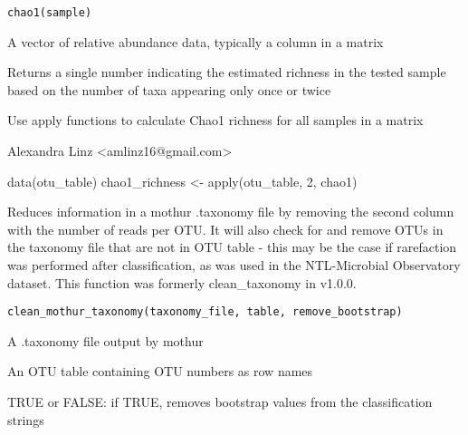 \documentclass[a4paper]{book}
\begin{document}
%
\begin{Usage}
\begin{verbatim}
chao1(sample)
\end{verbatim}
\end{Usage}
%
\begin{Arguments}
\begin{ldescription}
\item[\code{sample}] 
A vector of relative abundance data, typically a column in a matrix

\end{ldescription}
\end{Arguments}
%
\begin{Value}
Returns a single number indicating the estimated richness in the tested sample based on the number of taxa appearing only once or twice
\end{Value}
%
\begin{Note}\relax
Use apply functions to calculate Chao1 richness for all samples in a matrix

\end{Note}
%
\begin{Author}\relax
Alexandra Linz <amlinz16@gmail.com>
\end{Author}
%
\begin{Examples}
\begin{ExampleCode}
data(otu_table)
chao1_richness <- apply(otu_table, 2, chao1)
\end{ExampleCode}
\end{Examples}
%
\begin{Description}\relax
Reduces information in a mothur .taxonomy file by removing the second column with the number of reads per OTU. It will also check for and remove OTUs in the taxonomy file that are not in OTU table - this may be the case if rarefaction was performed after classification, as was used in the NTL-Microbial Observatory dataset. This function was formerly clean\_taxonomy in v1.0.0.
\end{Description}
%
\begin{Usage}
\begin{verbatim}
clean_mothur_taxonomy(taxonomy_file, table, remove_bootstrap)
\end{verbatim}
\end{Usage}
%
\begin{Arguments}
\begin{ldescription}
\item[\code{taxonomy\_file}] 
A .taxonomy file output by mothur

\item[\code{table}] 
An OTU table containing OTU numbers as row names

\item[\code{remove\_bootstrap}] 
TRUE or FALSE: if TRUE, removes bootstrap values from the classification strings

\end{ldescription}
\end{Arguments}
\end{document}
